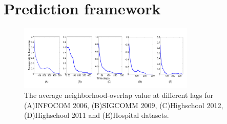 \noindent

 \section{Prediction framework}
 \label{prediction_1}
 


  
 \begin{figure}
 \centering
   \includegraphics*[width=0.75\textwidth,angle=0]{./texfiles/Chapter_1/fig/age_all_5-eps-converted-to.pdf}
 \caption{\label{aging}The average neighborhood-overlap value at different lags for (A)INFOCOM 2006, (B)SIGCOMM 2009, (C)Highschool 2012, (D)Highschool 2011 and (E)Hospital datasets.}
 \end{figure}





%  
%  
  
